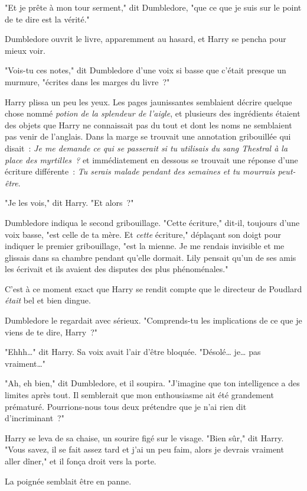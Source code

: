 "Et je prête à mon tour serment," dit Dumbledore, "que ce que je suis sur le point de te dire est la vérité."

Dumbledore ouvrit le livre, apparemment au hasard, et Harry se pencha pour mieux voir.

"Vois-tu ces notes," dit Dumbledore d'une voix si basse que c'était presque un murmure, "écrites dans les marges du livre~?"

Harry plissa un peu les yeux. Les pages jaunissantes semblaient décrire quelque chose nommé \emph{potion de la splendeur de l'aigle}, et plusieurs des ingrédients étaient des objets que Harry ne connaissait pas du tout et dont les noms ne semblaient pas venir de l'anglais. Dans la marge se trouvait une annotation gribouillée qui disait~: \emph{Je me demande ce qui se passerait si tu utilisais du sang Thestral à la place des myrtilles~?} et immédiatement en dessous se trouvait une réponse d'une écriture différente~: \emph{Tu serais malade pendant des semaines et tu mourrais peut-être}.

"Je les vois," dit Harry. "Et alors~?"

Dumbledore indiqua le second gribouillage. "Cette écriture," dit-il, toujours d'une voix basse, "est celle de ta mère. Et \emph{cette} écriture," déplaçant son doigt pour indiquer le premier gribouillage, "est la mienne. Je me rendais invisible et me glissais dans sa chambre pendant qu'elle dormait. Lily pensait qu'un de ses amis les écrivait et ils avaient des disputes des plus phénoménales."

C'est à ce moment exact que Harry se rendit compte que le directeur de Poudlard \emph{était} bel et bien dingue.

Dumbledore le regardait avec sérieux. "Comprends-tu les implications de ce que je viens de te dire, Harry~?"

"Ehhh…" dit Harry. Sa voix avait l'air d'être bloquée. "Désolé… je… pas vraiment…"

"Ah, eh bien," dit Dumbledore, et il soupira. "J'imagine que ton intelligence a des limites après tout. Il semblerait que mon enthousiasme ait été grandement prématuré. Pourrions-nous tous deux prétendre que je n'ai rien dit d'incriminant~?"

Harry se leva de sa chaise, un sourire figé sur le visage. "Bien sûr," dit Harry. "Vous savez, il se fait assez tard et j'ai un peu faim, alors je devrais vraiment aller dîner," et il fonça droit vers la porte.

La poignée semblait être en panne.

